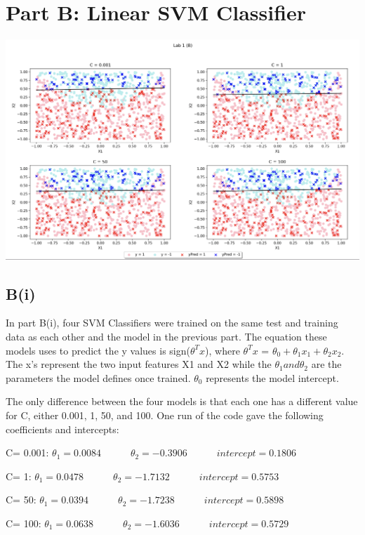 \documentclass{article}
\begin{document}
\section{Part B: Linear SVM Classifier}
\includegraphics[width=\linewidth]{pB.png}

\subsection{B(i)}
In part B(i), four SVM Classifiers were trained on the same test and training data as each other and the model in the previous part. The equation these models uses to predict the y values is sign($\theta^{T}x$), where $\theta^{T}x$ = $\theta_0 + \theta_1x_1 + \theta_2x_2$. The x's represent the two input features X1 and X2 while the $\theta_1 and \theta_2$ are the parameters the model defines once trained. $\theta_0$ represents the model intercept.

The only difference between the four models is that each one has a different value for C, either 0.001, 1, 50, and 100. One run of the code gave the following coefficients and intercepts:
\begin{center} C= 0.001: $\theta_1 = 0.0084 \quad \quad  \quad \theta_2 = -0.3906  \quad \quad  \quad intercept =  0.1806$\end{center}
\begin{center} C= 1: $\theta_1 = 0.0478 \quad \quad  \quad \theta_2 = -1.7132  \quad \quad  \quad intercept =  0.5753$\end{center}
\begin{center} C= 50: $\theta_1 = 0.0394 \quad \quad  \quad \theta_2 = -1.7238  \quad \quad  \quad intercept =  0.5898$\end{center}
\begin{center} C= 100: $\theta_1 = 0.0638 \quad \quad  \quad \theta_2 = -1.6036  \quad \quad  \quad intercept =  0.5729$\end{center}
\end{document}

